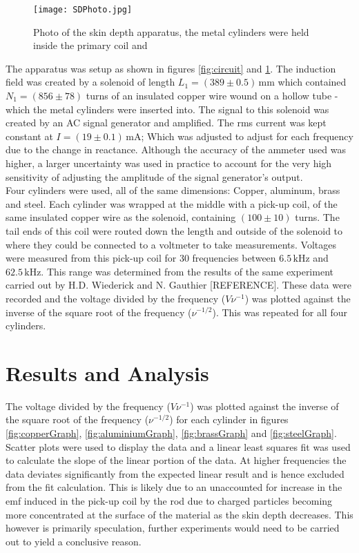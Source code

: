 \documentclass[a4paper,12pt,twocolumn]{article}
\begin{document}
	\begin{figure}
		\centering
		\texttt{[image: SDPhoto.jpg]}
		\captionsetup{font=scriptsize}
		\caption{Photo of the skin depth apparatus, the metal cylinders were held inside the primary coil and  }
		\label{fig:photo}
	\end{figure}

	The apparatus was setup as shown in figures \ref{fig:circuit} and \ref{fig:photo}. The induction field was created by a solenoid of length $L_1 = (389 \pm 0.5) \,\text{mm}$ which contained $N_1 = (856 \pm 78)$ turns of an insulated copper wire wound on a hollow tube - which the metal cylinders were inserted into. The signal to this solenoid was created by an AC signal generator and amplified. The rms current was kept constant at $I = (19 \pm 0.1)\,\text{mA}$; Which was adjusted to adjust for each frequency due to the change in reactance. Although the accuracy of the ammeter used was higher, a larger uncertainty was used in practice to account for the very high sensitivity of adjusting the amplitude of the signal generator's output.\\
	
	Four cylinders were used, all of the same dimensions: Copper, aluminum, brass and steel. Each cylinder was wrapped at the middle with a pick-up coil, of the same insulated copper wire as the solenoid, containing $(100 \pm 10)$ turns. The tail ends of this coil were routed down the length and outside of the solenoid to where they could be connected to a voltmeter to take measurements. Voltages were measured from this pick-up coil for 30 frequencies between $6.5 \,\text{kHz}$ and $62.5 \,\text{kHz}$. This range was determined from the results of the same experiment carried out by H.D. Wiederick and N. Gauthier [REFERENCE]. These data were recorded and the voltage divided by the frequency ($V \nu^{-1}$) was plotted against the inverse of the square root of the frequency ($\nu ^{-1/2}$). This was repeated for all four cylinders.
	
\section{Results and Analysis}
	
	The voltage divided by the frequency ($V \nu^{-1}$) was plotted against the inverse of the square root of the frequency ($\nu ^{-1/2}$) for each cylinder in figures \ref{fig:copperGraph}, \ref{fig:aluminiumGraph}, \ref{fig:brassGraph} and \ref{fig:steelGraph}. Scatter plots were used to display the data and a linear least squares fit was used to calculate the slope of the linear portion of the data. At higher frequencies the data deviates significantly from the expected linear result and is hence excluded from the fit calculation. This is likely due to an unaccounted for increase in the emf induced in the pick-up coil by the rod due to charged particles becoming more concentrated at the surface of the material as the skin depth decreases. This however is primarily speculation, further experiments would need to be carried out to yield a conclusive reason.\\
	
\end{document}
